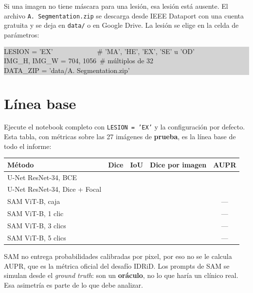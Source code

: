 \documentclass[11pt, a4paper]{article}
\begin{document}
\vspace{0.6em}
\noindent
{\sloppy Si una imagen no tiene m\'ascara para una lesi\'on, esa lesi\'on est\'a ausente. El archivo \mbox{\texttt{A.\ Segmentation.zip}} se descarga desde IEEE Dataport con una cuenta gratuita y se deja en \texttt{data/} o en Google Drive. La lesi\'on se elige en la celda de par\'ametros:\par}

\vspace{0.3em}
\noindent\colorbox{LightGray}{\parbox{\dimexpr\textwidth-2\fboxsep}{\ttfamily\small
LESION = 'EX'~~~~~~~~~~~~~\# 'MA', 'HE', 'EX', 'SE' u 'OD'\\
IMG\_H, IMG\_W = 704, 1056~\# m\'ultiplos de 32\\
DATA\_ZIP = 'data/A. Segmentation.zip'
}}

\section{Línea base}

Ejecute el notebook completo con \texttt{LESION = 'EX'} y la configuraci\'on por defecto. Esta tabla, con m\'etricas sobre las 27 im\'agenes de \textbf{prueba}, es la l\'inea base de todo el informe:

\vspace{0.5em}
\noindent
\begin{tabularx}{\textwidth}{@{}Xcccc@{}}
\toprule
\textbf{M\'etodo} & \textbf{Dice} & \textbf{IoU} & \textbf{Dice por imagen} & \textbf{AUPR}\\
\midrule
U-Net ResNet-34, BCE            & & & & \\
U-Net ResNet-34, Dice + Focal   & & & & \\
SAM ViT-B, caja                 & & & & ---\\
SAM ViT-B, 1 clic               & & & & ---\\
SAM ViT-B, 3 clics              & & & & ---\\
SAM ViT-B, 5 clics              & & & & ---\\
\bottomrule
\end{tabularx}

\vspace{0.8em}
\noindent
SAM no entrega probabilidades calibradas por pixel, por eso no se le calcula AUPR, que es la m\'etrica oficial del desaf\'io IDRiD. Los prompts de SAM se simulan desde el \emph{ground truth}: son un \textbf{or\'aculo}, no lo que har\'ia un cl\'inico real. Esa asimetr\'ia es parte de lo que debe analizar.
\end{document}
